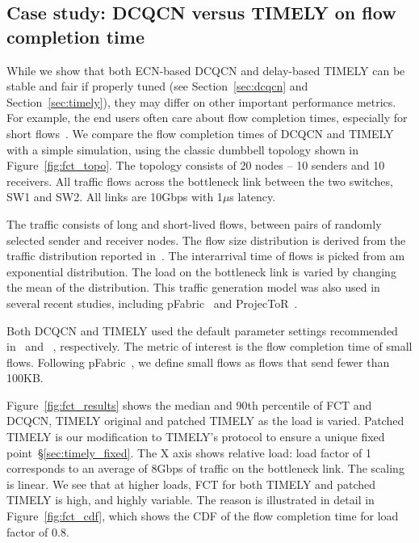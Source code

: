 \subsection {Case study: DCQCN versus TIMELY on flow completion time}
\label{sec:fct}

While we show that both ECN-based DCQCN and delay-based TIMELY can be 
stable and fair if properly tuned (see Section~\ref{sec:dcqcn} and 
Section~\ref{sec:timely}), they may differ on other important performance
metrics. For example, the end users often care about flow completion
times, especially for short flows~\cite{rcp}. We compare the flow completion 
times of DCQCN and TIMELY with 
a simple simulation, using the classic dumbbell topology shown in
Figure~\ref{fig:fct_topo}. The topology consists of 20 nodes -- 10 senders and
10 receivers. All traffic flows across the bottleneck link between the two
switches, SW1 and SW2. All links are 10Gbps with 1$\mu$s latency.

The traffic consists  of long and short-lived flows, between pairs of randomly
selected sender and receiver nodes. The flow size distribution is derived from
the traffic distribution reported in~\cite{dctcp}. The interarrival time of
flows is picked from am exponential distribution. The load on the bottleneck
link is varied by changing the mean of the distribution. This traffic generation
model was also used in several recent studies, including pFabric~\cite{pfabric}
and ProjecToR~\cite{projector}. 

Both DCQCN and TIMELY used the default parameter settings recommended
in~\cite{dcqcn} and ~\cite{timely}, respectively. 
The metric of interest is the flow completion time of small flows. Following 
pFabric~\cite{pfabric}, we define small flows as flows that send fewer than 100KB. 

Figure~\ref{fig:fct_results} shows the median and 90th percentile of FCT and
DCQCN, TIMELY original and patched TIMELY as the load is varied. Patched TIMELY is our 
modification to TIMELY's protocol to ensure a unique fixed point~\S\ref{sec:timely_fixed}. 
The X axis shows relative load: load factor of 1 corresponds to an average of 8Gbps of traffic 
on the bottleneck link. The scaling is linear. We see that at higher loads, FCT for both TIMELY 
and patched TIMELY is high, and highly variable. The reason is illustrated in detail in 
Figure~\ref{fig:fct_cdf}, which shows the CDF of the flow completion time for
load factor of 0.8. 


